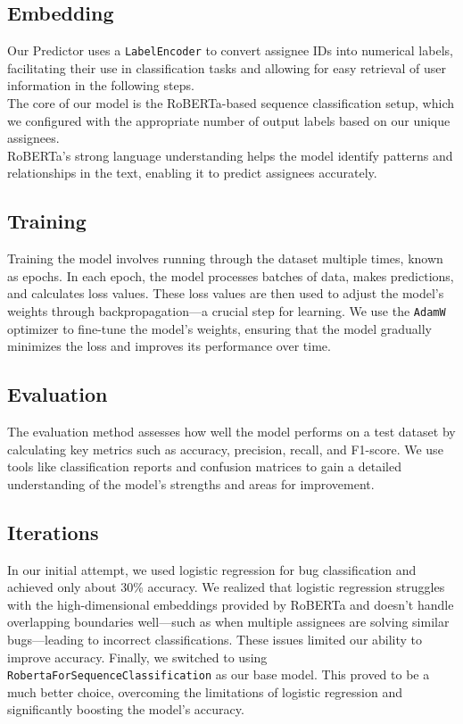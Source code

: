 \documentclass[tikz,10pt,fleqn]{article}
\begin{document}
\subsection*{Embedding} Our Predictor uses a \texttt{LabelEncoder} to convert assignee IDs into numerical labels, facilitating their use in classification tasks and allowing for easy retrieval of user information in the following steps. \\
The core of our model is the RoBERTa-based sequence classification setup, which we configured with the appropriate number of output labels based on our unique assignees.\\
 RoBERTa's strong language understanding helps the model identify patterns and relationships in the text, enabling it to predict assignees accurately.

\subsection*{Training} Training the model involves running through the dataset multiple times, known as epochs. In each epoch, the model processes batches of data, makes predictions, and calculates loss values. These loss values are then used to adjust the model's weights through backpropagation—a crucial step for learning. We use the \texttt{AdamW} optimizer to fine-tune the model's weights, ensuring that the model gradually minimizes the loss and improves its performance over time.

\subsection*{Evaluation} The evaluation method assesses how well the model performs on a test dataset by calculating key metrics such as accuracy, precision, recall, and F1-score. We use tools like classification reports and confusion matrices to gain a detailed understanding of the model's strengths and areas for improvement.

\subsection*{Iterations} In our initial attempt, we used logistic regression for bug classification and achieved only about 30\% accuracy. We realized that logistic regression struggles with the high-dimensional embeddings provided by RoBERTa and doesn't handle overlapping boundaries well—such as when multiple assignees are solving similar bugs—leading to incorrect classifications. These issues limited our ability to improve accuracy. Finally, we switched to using \texttt{RobertaForSequenceClassification} as our base model. This proved to be a much better choice, overcoming the limitations of logistic regression and significantly boosting the model's accuracy.
\end{document}
